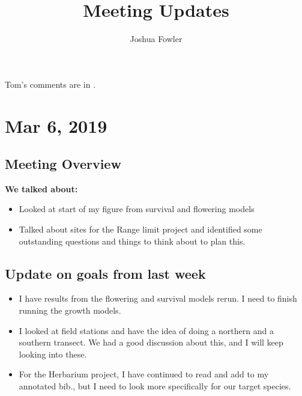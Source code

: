 \documentclass{article}
\title{Meeting Updates}
\author{Joshua Fowler}
\newcommand{\tom}[1]{{\textit{\color{WildStrawberry}{[#1]}}}}
\begin{document}
%
  \maketitle
  Tom's comments are in \tom{WildStrawberry}.

\section*{Mar 6, 2019}
\subsection*{Meeting Overview}
\textbf{We talked about:}
\begin{itemize}
\item{Looked at start of my figure from survival and flowering models}
\item{Talked about sites for the Range limit project and identified some outstanding questions and things to think about to plan this.}
\end{itemize}

\subsection*{Update on goals from last week}
\begin{itemize}
\item{I have results from the flowering and survival models rerun. I need to finish running the growth models.}
\item{I looked at field stations and have the idea of doing a northern and a southern transect. We had a good discussion about this, and I will keep looking into these.}
\item{For the Herbarium project, I have continued to read and add to my annotated bib., but I need to look more specifically for our target species.}
\end{itemize}
\end{document}
